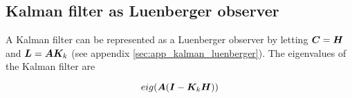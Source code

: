 \subsection{Kalman filter as Luenberger observer}

A Kalman filter can be represented as a Luenberger observer by letting
$\bm C = \bm H$ and $\bm L = \bm A \bm K_k$ (see appendix
\ref{sec:app_kalman_luenberger}). The eigenvalues of the Kalman filter are

\begin{equation}
  eig(\bm A(\bm I - \bm K_k\bm H))
\end{equation}

